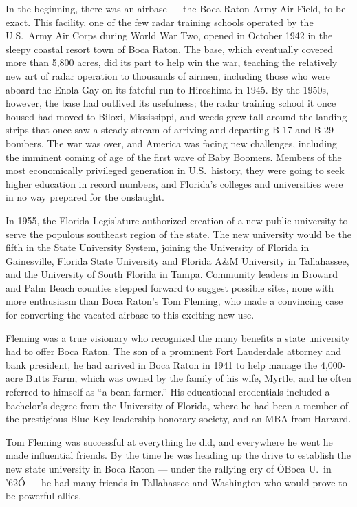 \documentclass[phd, 12pt, print]{fauthesis}
\begin{document}
In the beginning, there was an airbase  ---  the Boca Raton Army Air Field, to be exact.  This facility, one of the few radar training schools operated by the U.S.\ Army Air Corps during World War Two, opened in October 1942 in the sleepy coastal resort town of Boca Raton.  The base, which eventually covered more than 5,800 acres, did its part to help win the war, teaching the relatively new art of radar operation to thousands of airmen, including those who were aboard the Enola Gay on its fateful run to Hiroshima in 1945.  By the 1950s, however, the base had outlived its usefulness; the radar training school it once housed had moved to Biloxi, Mississippi, and weeds grew tall around the landing strips that once saw a steady stream of arriving and departing B-17 and B-29 bombers.  The war was over, and America was facing new challenges, including the imminent coming of age of the first wave of Baby Boomers.  Members of the most economically privileged generation in U.S.\ history, they were going to seek higher education in record numbers, and Florida's colleges and universities were in no way prepared for the onslaught.

In 1955, the Florida Legislature authorized creation of a new public university to serve the populous southeast region of the state.  The new university would be the fifth in the State University System, joining the University of Florida in Gainesville, Florida State University and Florida A\&M University in Tallahassee, and the University of South Florida in Tampa. Community leaders in Broward and Palm Beach counties stepped forward to suggest possible sites, none with more enthusiasm than Boca Raton's Tom Fleming, who made a convincing case for converting the vacated airbase to this exciting new use.

Fleming was a true visionary who recognized the many benefits a state university had to offer Boca Raton.  The son of a prominent Fort Lauderdale attorney and bank president, he had arrived in Boca Raton in 1941 to help manage the 4,000-acre Butts Farm, which was owned by the family of his wife, Myrtle, and he often referred to himself as ``a bean farmer.''  His educational credentials included a bachelor's degree from the University of Florida, where he had been a member of the prestigious Blue Key leadership honorary society, and an MBA from Harvard.

Tom Fleming was successful at everything he did, and everywhere he went he made influential friends.  By the time he was heading up the drive to establish the new state university in Boca Raton  ---  under the rallying cry of ÒBoca U.\ in '62Ó  ---  he had many friends in Tallahassee and Washington who would prove to be powerful allies.
\end{document}
